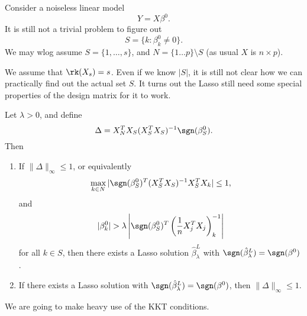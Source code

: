 \documentclass[a4paper]{article}
\begin{document}
Consider a noiseless linear model
\[
  Y = X \beta^0.
\]
It is still not a trivial problem to figure out
\[
  S = \{k: \beta_k^0 \not= 0\}.
\]
We may wlog assume $S = \{1, \ldots, s\}$, and $N = \{1 \ldots p\} \setminus S$ (as usual $X$ is $n \times p$).

We assume that $\rk (X_s) = s$. Even if we know $|S|$, it is still not clear how we can practically find out the actual set $S$. It turns out the Lasso still need some special properties of the design matrix for it to work.

\begin{thm}
  Let $\lambda > 0$, and define
  \[
    \Delta = X_N^T X_S (X_S^T X_S)^{-1} \sgn (\beta^0_S).
  \]
  Then
  \begin{enumerate}
    \item If $\|\Delta\|_\infty \leq 1$, or equivalently
      \[
        \max_{k \in N} |\sgn(\beta^0_S)^T (X^T_S X_S)^{-1} X^T_S X_k| \leq 1,
      \]
      and
      \[
        |\beta^0_k| > \lambda \left|\sgn(\beta^0_S)^T \left(\frac{1}{n} X_j^T X_j\right)^{-1}_k\right|
      \]
      for all $k \in S$, then there exists a Lasso solution $\hat{\beta}^L_\lambda$ with $\sgn(\hat{\beta}_\lambda^L) = \sgn(\beta^0)$.
    \item If there exists a Lasso solution with $\sgn (\hat{\beta}_\lambda^L) = \sgn(\beta^0)$, then $\|\Delta\|_\infty \leq 1$.
  \end{enumerate}
\end{thm}
We are going to make heavy use of the KKT conditions.
\end{document}
